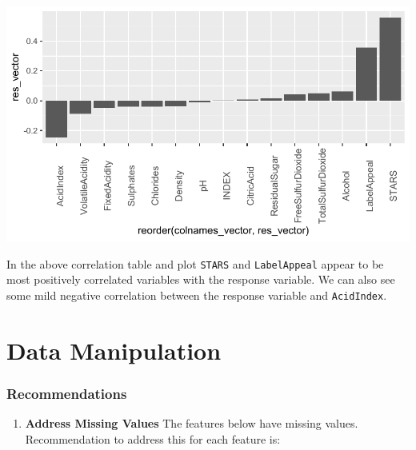 \documentclass[]{elsarticle} %
\providecommand{\tightlist}{%
  \setlength{\itemsep}{0pt}\setlength{\parskip}{0pt}}
\begin{document}
\begin{center}\includegraphics{paper_files/figure-latex/unnamed-chunk-9-1} \end{center}

In the above correlation table and plot \texttt{STARS} and
\texttt{LabelAppeal} appear to be most positively correlated variables
with the response variable. We can also see some mild negative
correlation between the response variable and \texttt{AcidIndex}.

\newpage

\hypertarget{data-manipulation}{%
\section{Data Manipulation}\label{data-manipulation}}

\hypertarget{recommendations}{%
\subsubsection{Recommendations}\label{recommendations}}

\begin{enumerate}
\def\labelenumi{\arabic{enumi}.}
\tightlist
\item
  \textbf{Address Missing Values} The features below have missing
  values. Recommendation to address this for each feature is:\\
\end{enumerate}
\end{document}
